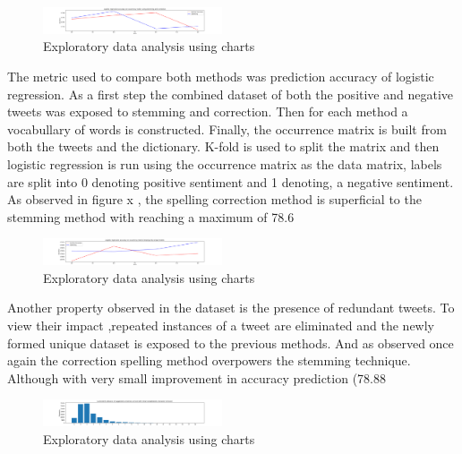 \documentclass[10pt,conference,compsocconf]{IEEEtran}
\begin{document}
\begin{figure}[!htb]
	\centering \includegraphics[width=200px]{../plots/raw.png}
	\caption{Exploratory data analysis using charts}
	\label{fig:data}
\end{figure}

The metric used to compare both methods was prediction accuracy of logistic regression. As a first step the combined dataset of both the positive and negative tweets was exposed to stemming and correction. Then for each method a vocabullary of words is constructed. Finally, the occurrence matrix is built from both the tweets and the dictionary. K-fold is used to split the matrix and then logistic regression is run using the occurrence matrix as the data matrix, labels are split into 0 denoting positive sentiment and 1 denoting, a negative sentiment.  As observed in figure x , the spelling correction method is superficial to the stemming method with reaching a maximum of 78.6 %


\begin{figure}[!htb]
	\centering \includegraphics[width=200px]{../plots/redundant.png}
	\caption{Exploratory data analysis using charts}
	\label{fig:data}
\end{figure}

Another property observed in the dataset is the presence of redundant tweets. To view their impact ,repeated instances of a tweet are eliminated and the newly formed unique dataset is exposed to the previous methods. And as observed once again the correction spelling method overpowers the stemming technique. Although with very small improvement in accuracy prediction (78.88%

\begin{figure}[!htb]
	\centering \includegraphics[width=200px]{../plots/distributionB.png}
	\caption{Exploratory data analysis using charts}
	\label{fig:data}
\end{figure}
\end{document}

